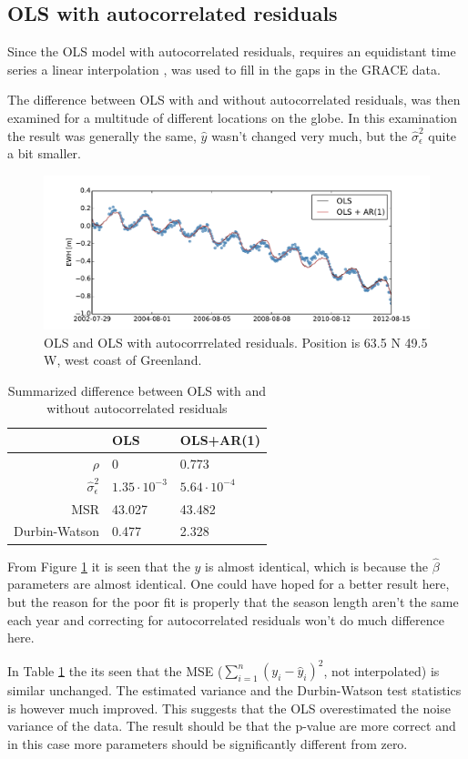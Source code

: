 
\subsection{OLS with autocorrelated residuals}
Since the OLS model with autocorrelated residuals, requires an equidistant time series a linear interpolation , was used to fill in the gaps in the GRACE data. 

The difference between OLS with and without autocorrelated residuals, was then examined for a multitude of different locations on the globe. In this examination the result was generally the same, $\hat{y}$ wasn't changed very much, but the $\hat{\sigma}_\epsilon^2$ quite a bit smaller.

\begin{figure}[H]
\centering
\includegraphics[width=1.0\textwidth]{figures/ar-compare}
\caption{OLS and OLS with autocorrrelated residuals. Position is 63.5 N 49.5 W, west coast of Greenland.}
\label{fig:ar-compare}
\end{figure}

\begin{table}[H]
\centering
\begin{tabular}{r | l l}
                             & OLS    & OLS+AR(1) \\ \hline
$\rho$		 & 0          & 0.773 \\
$\hat{\sigma}_\epsilon^2$ & $1.35 \cdot 10^{-3}$ & $ 5.64 \cdot 10^{-4}$ \\
MSR                   & 43.027 & 43.482 \\
Durbin-Watson & 0.477 & 2.328
\end{tabular}
\caption{Summarized difference between OLS with and without autocorrelated residuals}
\label{table:ar-compare}
\end{table}

From Figure \ref{fig:ar-compare} it is seen that the $\hat{y}$ is almost identical, which is because the $\hat{\beta}$ parameters are almost identical. One could have hoped for a better result here, but the reason for the poor fit is properly that the season length aren't the same each year and correcting for autocorrelated residuals won't do much difference here.

In Table \ref{table:ar-compare} the its seen that the MSE ($\sum_{i=1}^n (y_i - \hat{y}_i)^2$, not interpolated) is similar unchanged. The estimated variance and the Durbin-Watson test statistics is however much improved. This suggests that the OLS overestimated the noise variance of the data. The result should be that the p-value are more correct and in this case more parameters should be significantly different from zero.
